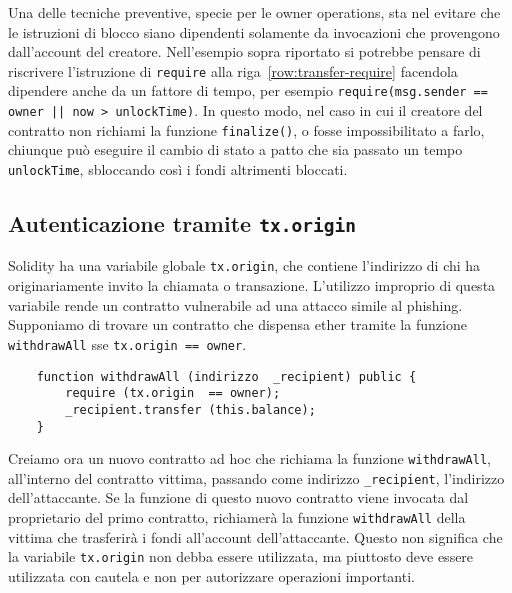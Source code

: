 Una delle tecniche preventive, specie per le owner operations, sta nel evitare che le istruzioni di blocco siano dipendenti solamente da invocazioni che provengono dall'account del creatore. Nell'esempio sopra riportato si potrebbe pensare di riscrivere l'istruzione di \lstinline|require| alla riga~\ref{row:transfer-require} facendola dipendere anche da un fattore di tempo, per esempio \lstinline!require(msg.sender == owner || now > unlockTime)!. In questo modo, nel caso in cui il creatore del contratto non richiami la funzione \lstinline|finalize()|, o fosse impossibilitato a farlo, chiunque può eseguire il cambio di stato a patto che sia passato un tempo \lstinline|unlockTime|, sbloccando così i fondi altrimenti bloccati.

\subsection*{Autenticazione tramite \lstinline|tx.origin|}
Solidity ha una variabile globale \lstinline|tx.origin|, che contiene l'indirizzo di chi ha originariamente invito la chiamata o transazione. L'utilizzo improprio di questa variabile rende un contratto vulnerabile ad una attacco simile al phishing. Supponiamo di trovare un contratto che dispensa ether tramite la funzione \lstinline|withdrawAll| sse \lstinline|tx.origin == owner|. 
\begin{lstlisting}
	function withdrawAll (indirizzo  _recipient) public {
		require (tx.origin  == owner);
		_recipient.transfer (this.balance);
	}
\end{lstlisting}
Creiamo ora un nuovo contratto ad hoc che richiama la funzione \lstinline|withdrawAll|, all'interno del contratto vittima, passando come indirizzo \lstinline|_recipient|, l'indirizzo dell'attaccante. Se la funzione di questo nuovo contratto viene invocata dal proprietario del primo contratto, richiamerà la funzione \lstinline|withdrawAll| della vittima che trasferirà i fondi all'account dell'attaccante. Questo non significa che la variabile \lstinline|tx.origin| non debba essere utilizzata, ma piuttosto deve essere utilizzata con cautela e non per autorizzare operazioni importanti. 

